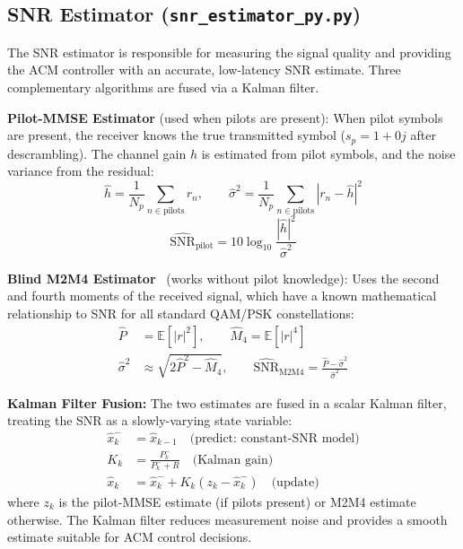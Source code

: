 \documentclass[12pt,a4paper]{report}
\begin{document}
\subsection{SNR Estimator (\texttt{snr\_estimator\_py.py})}

The SNR estimator is responsible for measuring the signal quality and providing
the ACM controller with an accurate, low-latency SNR estimate. Three
complementary algorithms are fused via a Kalman filter.

\textbf{Pilot-MMSE Estimator} (used when pilots are present):
When pilot symbols are present, the receiver knows the true transmitted symbol
($s_p = 1+0j$ after descrambling). The channel gain $h$ is estimated from
pilot symbols, and the noise variance from the residual:
\begin{equation}
    \hat{h} = \frac{1}{N_p}\sum_{n \in \text{pilots}} r_n, \qquad
    \hat{\sigma}^2 = \frac{1}{N_p}\sum_{n \in \text{pilots}} |r_n - \hat{h}|^2
\end{equation}
\begin{equation}
    \widehat{\text{SNR}}_\text{pilot} = 10\log_{10}\frac{|\hat{h}|^2}{\hat{\sigma}^2}
\end{equation}

\textbf{Blind M2M4 Estimator}~\cite{pauluzzi2000} (works without pilot knowledge):
Uses the second and fourth moments of the received signal, which have a known
mathematical relationship to SNR for all standard QAM/PSK constellations:
\begin{align}
    \hat{P}   &= \mathbb{E}[|r|^2], \qquad \hat{M}_4 = \mathbb{E}[|r|^4] \\
    \hat{\sigma}^2 &\approx \sqrt{2\hat{P}^2 - \hat{M}_4}, \qquad
    \widehat{\text{SNR}}_\text{M2M4} = \frac{\hat{P} - \hat{\sigma}^2}{\hat{\sigma}^2}
\end{align}

\textbf{Kalman Filter Fusion:}
The two estimates are fused in a scalar Kalman filter, treating the SNR as
a slowly-varying state variable:
\begin{align}
    \hat{x}^-_k &= \hat{x}_{k-1} \quad \text{(predict: constant-SNR model)} \\
    K_k &= \frac{P^-_k}{P^-_k + R} \quad \text{(Kalman gain)} \\
    \hat{x}_k &= \hat{x}^-_k + K_k(z_k - \hat{x}^-_k) \quad \text{(update)}
\end{align}
where $z_k$ is the pilot-MMSE estimate (if pilots present) or M2M4 estimate
otherwise. The Kalman filter reduces measurement noise and provides a smooth
estimate suitable for ACM control decisions.
\end{document}
